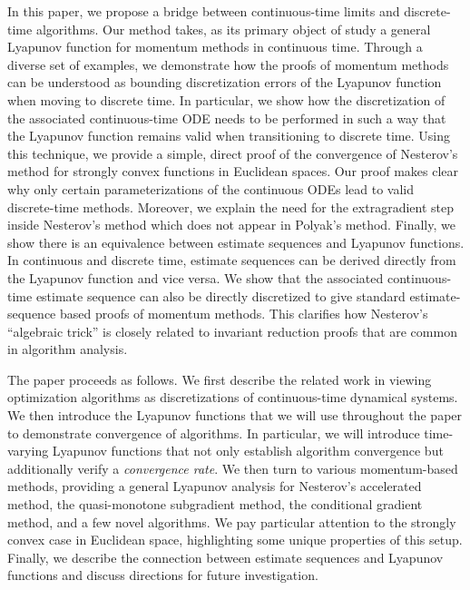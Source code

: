 \documentclass[11pt]{article}
\theoremstyle{plain}
\begin{document}
In this paper, we propose a bridge between continuous-time limits and discrete-time algorithms.  Our method takes, as its primary object of study a general Lyapunov function for momentum methods in continuous time.  Through a diverse set of examples, we demonstrate how the proofs of momentum methods can be understood as bounding discretization errors of the Lyapunov function when moving to discrete time.  In particular, we show how the discretization of the associated continuous-time ODE needs to be performed in such a way that the Lyapunov function remains valid when transitioning to discrete time.
Using this technique, we provide a simple, direct proof of the convergence of Nesterov's method for strongly convex functions in Euclidean spaces.  Our proof makes clear why only certain parameterizations of the continuous ODEs lead to valid discrete-time methods.  Moreover, we explain the need for the extragradient step inside Nesterov's method which does not appear in Polyak's method.  
Finally, we show there is an equivalence between estimate sequences and Lyapunov functions.  In continuous and discrete time, estimate sequences can be derived directly from the Lyapunov function and vice versa.  We show that the associated continuous-time estimate sequence can also be directly discretized to give standard estimate-sequence based proofs of momentum methods.  This clarifies how Nesterov's ``algebraic trick'' is closely related to invariant reduction proofs that are common in algorithm analysis.

The paper proceeds as follows.  We first describe the related work in viewing optimization algorithms as discretizations of continuous-time dynamical systems.  We then introduce the Lyapunov functions that we will use throughout the paper to demonstrate convergence of algorithms.  In particular, we will introduce time-varying Lyapunov functions that not only establish algorithm convergence but additionally verify a \emph{convergence rate}.  
 We then turn to various momentum-based methods, providing a general Lyapunov analysis for Nesterov's accelerated method, the quasi-monotone subgradient method, the conditional gradient method, and a few novel algorithms.  We pay particular attention to the strongly convex case in Euclidean space, highlighting some unique properties of this setup.  Finally, we describe the connection between estimate sequences and Lyapunov functions and discuss directions for future investigation.
\end{document}
